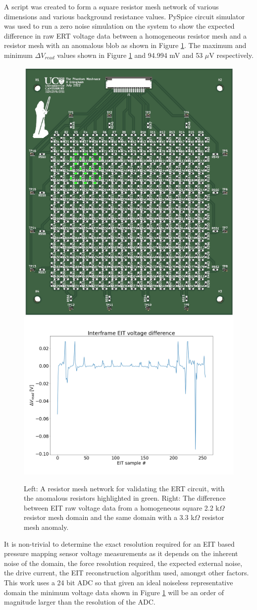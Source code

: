A script was created to form a square resistor mesh network of various dimensions and various background resistance values. PySpice circuit simulator \cite{PySpice2021} was used to run a zero noise simulation on the system to show the expected difference in raw ERT voltage data between a homogeneous resistor mesh and a resistor mesh with an anomalous blob as shown in Figure \ref{fig:vdiff_res_mesh}. The maximum and minimum $\Delta V_{read}$ values shown in Figure \ref{fig:vdiff_res_mesh} and 94.994 mV and 53 $\mu$V respectively.
\begin{figure}[H]
\centering
\includegraphics[width=0.32\linewidth]{Figures/res_mesh_pcb.png}
\hspace{1cm}
\includegraphics[width=0.56\linewidth]{Figures/EIT_Vdiff_res_mesh_2k2bg_3k3anom.png} %
\caption{Left: A resistor mesh network for validating the ERT circuit, with the anomalous resistors highlighted in green. Right: The difference between EIT raw voltage data from a homogeneous square 2.2 k$\Omega$ resistor mesh domain and the same domain with a 3.3 k$\Omega$ resistor mesh anomaly.}
\label{fig:vdiff_res_mesh}
\end{figure}

It is non-trivial to determine the exact resolution required for an EIT based pressure mapping sensor voltage measurements as it depends on the inherent noise of the domain, the force resolution required, the expected external noise, the drive current, the EIT reconstruction algorithm used, amongst other factors. This work uses a 24 bit ADC so that given an ideal noiseless representative domain the minimum voltage data shown in Figure \ref{fig:vdiff_res_mesh} will be an order of magnitude larger than the resolution of the ADC.


